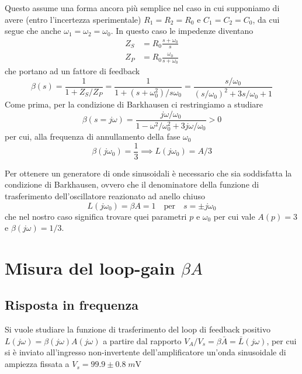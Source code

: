 \documentclass[10pt, a4paper, italian]{article}
\begin{document}
Questo assume una forma ancora più semplice nel caso in cui supponiamo di avere
(entro l'incertezza sperimentale) $R_1 = R_2 = R_0$ e $C_1 = C_2 = C_0$,
da cui segue che anche $\omega_1 = \omega_2 = \omega_0$. In questo caso le
impedenze diventano
\begin{align*}
Z_S &= R_0 \frac{s + \omega_0}{s} \\
Z_P &= R_0 \frac{\omega_0}{s + \omega_0}
\end{align*}
che portano ad un fattore di feedback
\begin{equation}
\beta(s) = \frac{1}{1 + Z_S/Z_P} =
\frac{1}{1 + (s + \omega_0^2)/s \omega_0} =
\frac{s/\omega_0}{(s/\omega_0)^2 + 3s/\omega_0 + 1}
\end{equation}
Come prima, per la condizione di Barkhausen ci restringiamo a studiare
\[
\beta(s = j \omega) = 
\frac{j \omega/\omega_0}{1 - \omega^2/\omega_0^2 + 3j \omega/\omega_0} > 0
\]
per cui, alla frequenza di annullamento della fase $\omega_0$
\begin{equation}\label{eq: loop-gain-approx}
\beta(j \omega_0) = \frac{1}{3} \implies L(j \omega_0) = A/3
\end{equation}

Per ottenere un generatore di onde sinusoidali è necessario che sia
soddisfatta la condizione di Barkhausen, ovvero che il denominatore della
funzione di trasferimento dell'oscillatore reazionato ad anello chiuso
\[
L(j \omega_0) = \beta A = 1 \quad \text{per} \quad s = \pm j \omega_0
\]
che nel nostro caso significa trovare quei parametri $p$ e $\omega_0$ per cui
vale $A(p) = 3$ e $\beta(j\omega) = 1/3$.



\section{Misura del loop-gain $\beta A$}

\subsection{Risposta in frequenza}
Si vuole studiare la funzione di trasferimento del loop di feedback positivo
$L(j\omega) = \beta(j\omega) A(j\omega)$ a partire dal rapporto
$V_A/V_s = \beta \bar{A} = \bar{L}(j\omega)$, per cui si è
inviato all'ingresso non-invertente dell'amplificatore un'onda sinusoidale
di ampiezza fissata a $V_s = 99.9 \pm 0.8 \; \si{m\V}$
\end{document}
